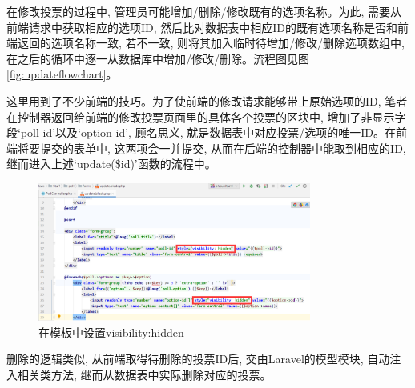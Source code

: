 在修改投票的过程中, 管理员可能增加/删除/修改既有的选项名称。为此, 需要从前端请求中获取相应的选项ID, 然后比对数据表中相应ID的既有选项名称是否和前端返回的选项名称一致, 若不一致, 则将其加入临时待增加/修改/删除选项数组中, 在之后的循环中逐一从数据库中增加/修改/删除。流程图见图 \ref{fig:updateflowchart}。

这里用到了不少前端的技巧。为了使前端的修改请求能够带上原始选项的ID, 笔者在控制器返回给前端的修改投票页面里的具体各个投票的区块中, 增加了非显示字段`poll-id'以及`option-id', 顾名思义, 就是数据表中对应投票/选项的唯一ID。在前端将要提交的表单中, 这两项会一并提交, 从而在后端的控制器中能取到相应的ID, 继而进入上述`update(\$id)'函数的流程中。

\begin{figure}[h]
    \centering
    \includegraphics[width=0.8\textwidth]{support-files/4.5.1-visibility-hidden.png}
    \caption{在模板中设置visibility:hidden}
    \label{fig:visibilityhidden}
\end{figure}

删除的逻辑类似, 从前端取得待删除的投票ID后, 交由Laravel的模型模块, 自动注入相关类方法, 继而从数据表中实际删除对应的投票。


